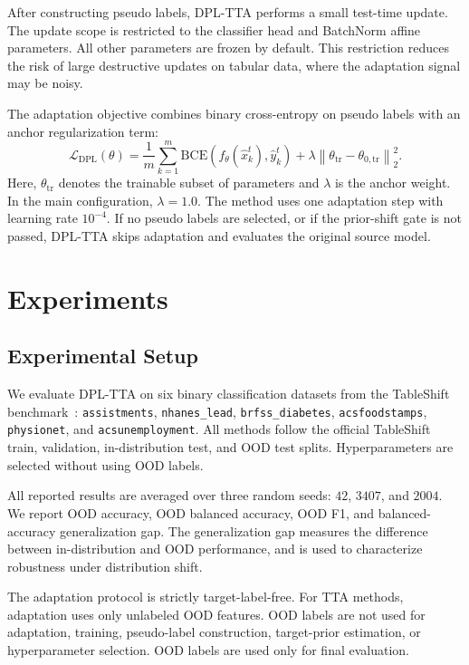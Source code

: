 \documentclass{article}
\begin{document}
After constructing pseudo labels, DPL-TTA performs a small test-time update. The update scope is restricted to the classifier head and BatchNorm affine parameters. All other parameters are frozen by default. This restriction reduces the risk of large destructive updates on tabular data, where the adaptation signal may be noisy.

The adaptation objective combines binary cross-entropy on pseudo labels with an anchor regularization term:
\begin{equation}
\mathcal{L}_{\mathrm{DPL}}(\theta)
=
\frac{1}{m}
\sum_{k=1}^{m}
\mathrm{BCE}\!\left(f_{\theta}(\hat{x}_k^{t}), \hat{y}_k^{t}\right)
+
\lambda
\left\|
\theta_{\mathrm{tr}}
-
\theta_{0,\mathrm{tr}}
\right\|_2^2 .
\label{eq:dpl_loss}
\end{equation}
Here, $\theta_{\mathrm{tr}}$ denotes the trainable subset of parameters and $\lambda$ is the anchor weight. In the main configuration, $\lambda=1.0$. The method uses one adaptation step with learning rate $10^{-4}$. If no pseudo labels are selected, or if the prior-shift gate is not passed, DPL-TTA skips adaptation and evaluates the original source model.

\section{Experiments}

\subsection{Experimental Setup}

We evaluate DPL-TTA on six binary classification datasets from the TableShift benchmark~\citep{gardner2023tableshift}:
\texttt{assistments}, \texttt{nhanes\_lead}, \texttt{brfss\_diabetes}, \texttt{acsfoodstamps}, \texttt{physionet}, and \texttt{acsunemployment}. All methods follow the official TableShift train, validation, in-distribution test, and OOD test splits. Hyperparameters are selected without using OOD labels.

All reported results are averaged over three random seeds: $42$, $3407$, and $2004$. We report OOD accuracy, OOD balanced accuracy, OOD F1, and balanced-accuracy generalization gap. The generalization gap measures the difference between in-distribution and OOD performance, and is used to characterize robustness under distribution shift.

The adaptation protocol is strictly target-label-free. For TTA methods, adaptation uses only unlabeled OOD features. OOD labels are not used for adaptation, training, pseudo-label construction, target-prior estimation, or hyperparameter selection. OOD labels are used only for final evaluation.
\end{document}
